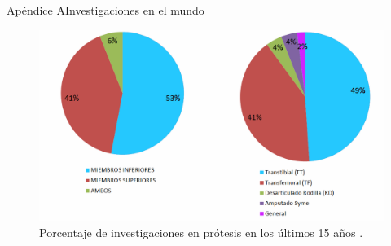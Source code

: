 \documentclass[10pt]{beamer}
\begin{document}
{\BiOM
\begin{frame}
\end{frame}}
\appendix
{}
\setcounter{finalframe}{\value{framenumber}}
\begin{frame}{Apéndice A}{Investigaciones en el mundo}

\begin{figure}
\begin{centering}
\includegraphics[scale=0.25]{Feathergraphics/Estadisticasestudios}
\par\end{centering}
\caption{Porcentaje de investigaciones en prótesis en los últimos 15 años \cite{Eshraghi2013}.}
\end{figure}
\end{frame}
\end{document}
